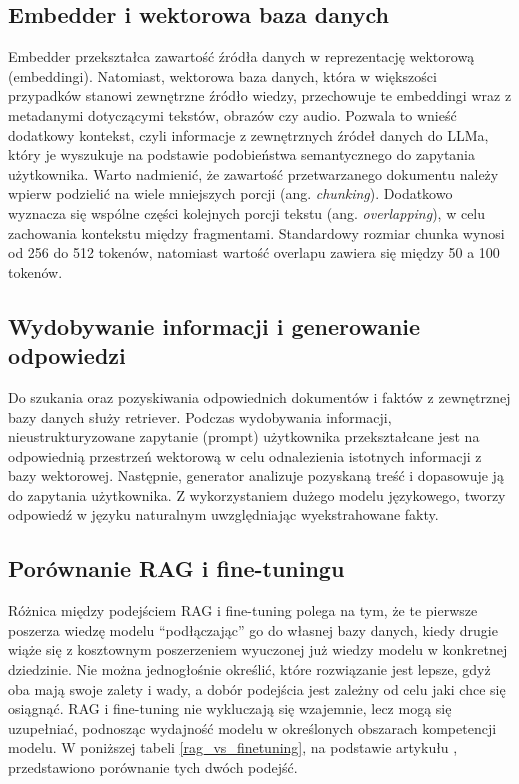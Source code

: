         \subsection{Embedder i wektorowa baza danych}
        Embedder przekształca zawartość źródła danych w reprezentację wektorową (embeddingi). Natomiast, wektorowa baza danych, która w większości przypadków stanowi zewnętrzne źródło wiedzy, przechowuje te embeddingi wraz z metadanymi dotyczącymi tekstów, obrazów czy audio. Pozwala to wnieść dodatkowy kontekst, czyli informacje z zewnętrznych źródeł danych do LLMa, który je wyszukuje na podstawie podobieństwa semantycznego do zapytania użytkownika. Warto nadmienić, że zawartość przetwarzanego dokumentu należy wpierw podzielić na wiele mniejszych porcji (ang. \textit{chunking}). Dodatkowo wyznacza się wspólne części kolejnych porcji tekstu (ang. \textit{overlapping}), w celu zachowania kontekstu między fragmentami. Standardowy rozmiar chunka wynosi od 256 do 512 tokenów, natomiast wartość overlapu zawiera się między 50 a 100 tokenów.
        
        
        \subsection{Wydobywanie informacji i generowanie odpowiedzi}
        Do szukania oraz pozyskiwania odpowiednich dokumentów i faktów z zewnętrznej bazy danych służy retriever. Podczas wydobywania informacji, nieustrukturyzowane zapytanie (prompt) użytkownika przekształcane jest na odpowiednią przestrzeń wektorową w celu odnalezienia istotnych informacji z bazy wektorowej. Następnie, generator analizuje pozyskaną treść i dopasowuje ją do zapytania użytkownika. Z wykorzystaniem dużego modelu językowego, tworzy odpowiedź w języku naturalnym uwzględniając wyekstrahowane fakty.


        \subsection{Porównanie RAG i fine-tuningu}
        Różnica między podejściem RAG i fine-tuning polega na tym, że te pierwsze poszerza wiedzę modelu \enquote{podłączając} go do własnej bazy danych, kiedy drugie wiąże się z kosztownym poszerzeniem wyuczonej już wiedzy modelu w konkretnej dziedzinie. Nie można jednogłośnie określić, które rozwiązanie jest lepsze, gdyż oba mają swoje zalety i wady, a dobór podejścia jest zależny od celu jaki chce się osiągnąć. RAG i fine-tuning nie wykluczają się wzajemnie, lecz mogą się uzupełniać, podnosząc wydajność modelu w określonych obszarach kompetencji modelu. W poniższej tabeli \ref{rag_vs_finetuning}, na podstawie artykułu \cite{rag_for_llm2023}, przedstawiono porównanie tych dwóch podejść.


